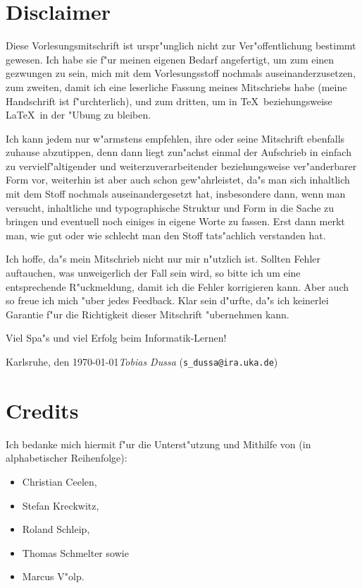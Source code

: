 
\section*{Disclaimer}

Diese Vorlesungsmitschrift ist urspr"unglich nicht zur Ver"offentlichung
bestimmt gewesen. Ich habe sie f"ur meinen eigenen Bedarf angefertigt,
um zum einen gezwungen zu sein, mich mit dem Vorlesungsstoff nochmals
auseinanderzusetzen, zum zweiten, damit ich eine leserliche Fassung
meines Mitschriebs habe (meine Handschrift ist f"urchterlich), und zum
dritten, um in \TeX\ beziehungsweise \LaTeX\ in der "Ubung zu
bleiben.

Ich kann jedem nur w"armstens empfehlen, ihre oder seine Mitschrift
ebenfalls zuhause abzutippen, denn dann liegt zun"achst einmal der
Aufschrieb in einfach zu vervielf"altigender und weiterzuverarbeitender
beziehungsweise ver"anderbarer Form vor, weiterhin ist aber auch schon
gew"ahrleistet, da"s man sich inhaltlich mit dem Stoff nochmals
auseinandergesetzt hat, insbesondere dann, wenn man versucht,
inhaltliche und typographische Struktur und Form in die Sache zu
bringen und eventuell noch einiges in eigene Worte zu fassen. Erst
dann merkt man, wie gut oder wie schlecht man den Stoff tats"achlich
verstanden hat.

Ich hoffe, da"s mein Mitschrieb nicht nur mir n"utzlich ist. Sollten
Fehler auftauchen, was unweigerlich der Fall sein wird, so bitte ich
um eine entsprechende R"uckmeldung, damit ich die Fehler korrigieren
kann. Aber auch so freue ich mich "uber jedes Feedback. Klar sein
d"urfte, da"s ich keinerlei Garantie f"ur die Richtigkeit dieser
Mitschrift "ubernehmen kann.

Viel Spa"s und viel Erfolg beim Informatik-Lernen!

Karlsruhe, den \today\hfill \textsl{Tobias Dussa}
(\verb~s_dussa@ira.uka.de~)

\section*{Credits}

Ich bedanke mich hiermit f"ur die Unterst"utzung und Mithilfe von (in
alphabetischer Reihenfolge):
\begin{itemize}
\item Christian Ceelen,
\item Stefan Kreckwitz,
\item Roland Schleip,
\item Thomas Schmelter sowie
\item Marcus V"olp.
\end{itemize}

\newpage
